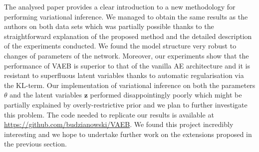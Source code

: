\documentclass[../report/report.tex]{subfiles}
\begin{document}
The analysed paper provides a clear introduction to a new methodology for performing variational inference. We managed to obtain the same results as the authors on both data sets which was partially possible thanks to the straightforward explanation of the proposed method and the detailed description of the experiments conducted. We found the model structure very robust to changes of parameters of the network. Moreover, our experiments show that the performance of VAEB is superior to that of the vanilla AE architecture and it is resistant to superfluous latent variables thanks to automatic regularisation via the KL-term. Our implementation of variational inference on both the parameters $\theta$ and the latent variables $\mathbf{z}$ performed disappointingly poorly which might be partially explained by overly-restrictive prior and we plan to further investigate this problem. The code needed to replicate our results is available at \url{https://github.com/budzianowski/VAEB}. We found this project incredibly interesting and we hope to undertake further work on the extensions proposed in the previous section.
\end{document}
